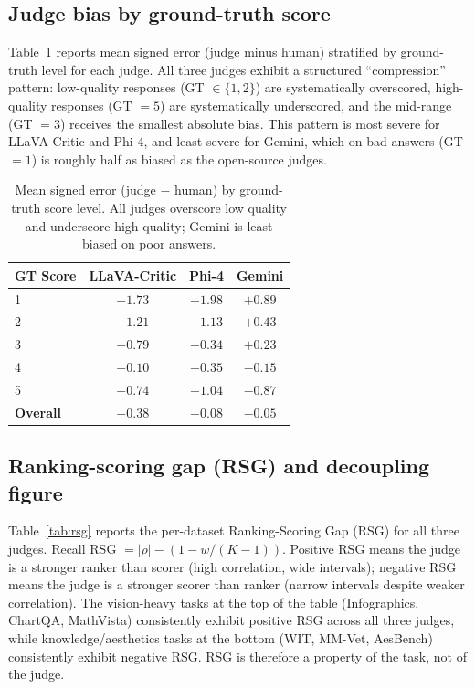 \documentclass{article}
\begin{document}
\subsection{Judge bias by ground-truth score}
\label{app:bias}

Table~\ref{tab:bias} reports mean signed error (judge minus human) stratified by ground-truth level for each judge. All three judges exhibit a structured ``compression'' pattern: low-quality responses (GT $\in \{1, 2\}$) are systematically overscored, high-quality responses (GT $= 5$) are systematically underscored, and the mid-range (GT $= 3$) receives the smallest absolute bias. This pattern is most severe for LLaVA-Critic and Phi-4, and least severe for Gemini, which on bad answers (GT $= 1$) is roughly half as biased as the open-source judges.

\begin{table}[t]
\centering
\caption{Mean signed error (judge $-$ human) by ground-truth score level. All judges overscore low quality and underscore high quality; Gemini is least biased on poor answers.}
\label{tab:bias}
\small
\begin{tabular}{lccc}
\toprule
\textbf{GT Score} & \textbf{LLaVA-Critic} & \textbf{Phi-4} & \textbf{Gemini} \\
\midrule
1 & $+1.73$ & $+1.98$ & $\mathbf{+0.89}$ \\
2 & $+1.21$ & $+1.13$ & $\mathbf{+0.43}$ \\
3 & $+0.79$ & $+0.34$ & $\mathbf{+0.23}$ \\
4 & $+0.10$ & $-0.35$ & $\mathbf{-0.15}$ \\
5 & $-0.74$ & $-1.04$ & $\mathbf{-0.87}$ \\
\midrule
\textbf{Overall} & $+0.38$ & $+0.08$ & $\mathbf{-0.05}$ \\
\bottomrule
\end{tabular}
\end{table}

\subsection{Ranking-scoring gap (RSG) and decoupling figure}
\label{app:rsg}

Table~\ref{tab:rsg} reports the per-dataset Ranking-Scoring Gap (RSG) for all three judges. Recall RSG $= |\rho| - (1 - w/(K-1))$. Positive RSG means the judge is a stronger ranker than scorer (high correlation, wide intervals); negative RSG means the judge is a stronger scorer than ranker (narrow intervals despite weaker correlation). The vision-heavy tasks at the top of the table (Infographics, ChartQA, MathVista) consistently exhibit positive RSG across all three judges, while knowledge/aesthetics tasks at the bottom (WIT, MM-Vet, AesBench) consistently exhibit negative RSG. RSG is therefore a property of the task, not of the judge.
\end{document}
